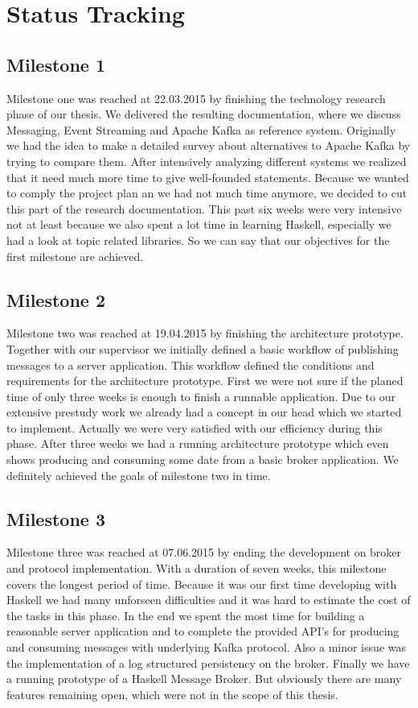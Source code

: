 \section*{Status Tracking}
\label{sec:status-tracking}

\subsection{Milestone 1}
Milestone one was reached at 22.03.2015 by finishing the technology research
phase of our thesis. We delivered the resulting documentation, where we discuss
Messaging, Event Streaming and Apache Kafka as reference system. Originally we
had the idea to make a detailed survey about alternatives to Apache Kafka by
trying to compare them. After intensively analyzing different systems we
realized that it need much more time to give well-founded statements. Because we
wanted to comply the project plan an we had not much time anymore, we decided to
cut this part of the research documentation. This past six weeks were very
intensive not at least because we also spent a lot time in learning Haskell,
especially we had a look at topic related libraries. So we can say that our
objectives for the first milestone are achieved.

\subsection{Milestone 2}
Milestone two was reached at 19.04.2015 by finishing the architecture prototype.
Together with our supervisor we initially defined a basic workflow of publishing
messages to a server application. This workflow defined the conditions and
requirements for the architecture prototype. First we were not sure if the
planed time of only three weeks is enough to finish a runnable application. Due
to our extensive prestudy work we already had a concept in our head which we
started to implement. Actually we were very satisfied with our efficiency during
this phase. After three weeks we had a running architecture prototype which even
shows producing and consuming some date from a basic broker application. We
definitely achieved the goals of milestone two in time. 

\subsection{Milestone 3} 
Milestone three was reached at 07.06.2015 by ending the
development on broker and protocol implementation. With a duration of seven
weeks, this milestone covers the longest period of time. Because it was our
first time developing with Haskell we had many unforseen difficulties and it was
hard to estimate the cost of the tasks in this phase. In the end we spent the
most time for building a reasonable server application and to complete the
provided API's for producing and consuming messages with underlying Kafka
protocol. Also a minor issue was the implementation of a log structured
persistency on the broker. Finally we have a running prototype of a Haskell
Message Broker. But obviously there are many features remaining open, which were
not in the scope of this thesis. 

